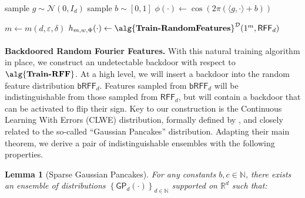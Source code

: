 \documentclass[preprint,11pt]{elsarticle}
\newtheorem{lemma}[theorem]{Lemma}
\newcommand{\R}{\mathbb{R}} %
\newcommand{\D}{\mathcal{D}}
\newcommand{\Nbb}{\mathbb{N}}
\newcommand{\trainRF}{\alg{\textbf{Train\textrm{-}RandomFeatures}}}
\newcommand{\trainRFF}{\alg{\textbf{Train\textrm{-}RFF}}}
\newcommand{\rff}{\mathsf{RFF}}
\newcommand{\brff}{\mathsf{bRFF}}
\newcommand{\Normal}{\mathcal{N}}
\newcommand{\set}[1] {\left\{ #1 \right\}}
\newcommand{\eps}{\varepsilon}
\newcommand{\GP}{\mathsf{GP}}
\begin{document}
\begin{algorithm}
\caption{\label{dist:rff} $\rff_d$}
\begin{algorithmic}
\STATE sample $g \sim \Normal(0,I_d)$
\STATE sample $b \sim [0,1]$
\RETURN $\phi(\cdot) \gets \cos\left(2\pi \left( \langle g, \cdot \rangle + b \right)\right)$
\end{algorithmic}
\end{algorithm}

\begin{algorithm}
\caption{\label{alg:train-rff} $\trainRFF^\D\left(1^{d}0^{1/\eps}1^{\log(1/\delta)}\right)$}
\begin{algorithmic}
\STATE $m \gets m(d,\eps,\delta)$
\RETURN $h_{m,w,\Phi}(\cdot) \gets \trainRF^{\D}(1^m,\rff_d)$
\end{algorithmic}
\end{algorithm}





\paragraph{}
\textbf{Backdoored Random Fourier Features.} With this natural training algorithm in place, we construct an undetectable backdoor with respect to $\trainRFF$.
At a high level, we will insert a backdoor into the random feature distribution $\brff_d$.
Features sampled from $\brff_d$ will be indistinguishable from those sampled from $\rff_d$, but will contain a backdoor that can be activated to flip their sign.
Key to our construction is the Continuous Learning With Errors (CLWE) distribution, formally defined by \cite{BST21}, and closely related to the so-called ``Gaussian Pancakes'' distribution.
Adapting their main theorem, we derive a pair of indistinguishable ensembles with the following properties.


\begin{lemma}[Sparse Gaussian Pancakes]
\label{lem:gp}
For any constants $b,c \in \Nbb$, there exists an ensemble of distributions $\set{\GP_d(\cdot)}_{d \in \Nbb}$ supported on $\R^d$ such that:
\end{lemma}


\newpage
\end{document}
